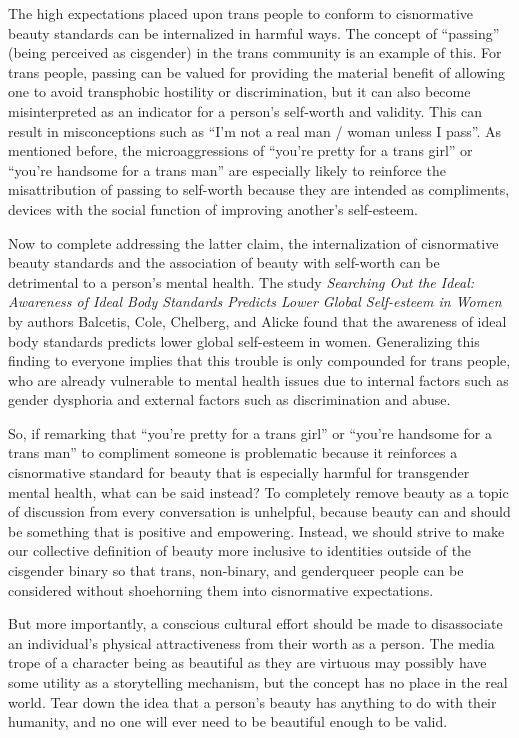 \documentclass[12pt, letterpaper]{article}
\begin{document}
\begin{mla}
The high expectations placed upon trans people to conform to cisnormative
beauty standards can be internalized in harmful ways. The concept of
``passing'' (being perceived as cisgender) in the trans community is an
example of this. For trans people, passing can be valued for providing the
material benefit of allowing one to avoid transphobic hostility or
discrimination, but it can also become misinterpreted as an indicator for a
person's self-worth and validity. This can result in misconceptions such as
``I'm not a real man / woman unless I pass''. As mentioned before, the
microaggressions of ``you're pretty for a trans girl'' or ``you're handsome
for a trans man'' are especially likely to reinforce the misattribution of
passing to self-worth because they are intended as compliments, devices with
the social function of improving another's self-esteem.

Now to complete addressing the latter claim, the internalization of
cisnormative beauty standards and the association of beauty with self-worth
can be detrimental to a person's mental health. The study \textit{Searching
Out the Ideal: Awareness of Ideal Body Standards Predicts Lower Global
Self-esteem in Women} by authors Balcetis, Cole, Chelberg, and Alicke found
that the awareness of ideal body standards predicts lower global self-esteem
in women. Generalizing this finding to everyone implies that this trouble is
only compounded for trans people, who are already vulnerable to mental health
issues due to internal factors such as gender dysphoria and external factors
such as discrimination and abuse.

So, if remarking that ``you're pretty for a trans girl'' or ``you're handsome
for a trans man'' to compliment someone is problematic because it reinforces a
cisnormative standard for beauty that is especially harmful for transgender
mental health, what can be said instead? To completely remove beauty as a
topic of discussion from every conversation is unhelpful, because beauty can
and should be something that is positive and empowering. Instead, we should
strive to make our collective definition of beauty more inclusive to
identities outside of the cisgender binary so that trans, non-binary, and
genderqueer people can be considered without shoehorning them into
cisnormative expectations.

But more importantly, a conscious cultural effort should be made to
disassociate an individual's physical attractiveness from their worth as a
person. The media trope of a character being as beautiful as they are virtuous
may possibly have some utility as a storytelling mechanism, but the concept
has no place in the real world. Tear down the idea that a person's beauty has
anything to do with their humanity, and no one will ever need to be beautiful
enough to be valid.

\end{mla}
\end{document}
